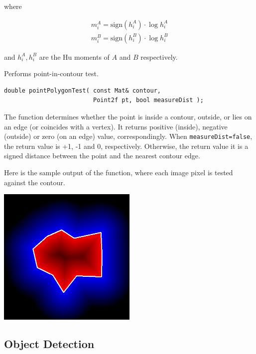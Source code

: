 \begin{description}
where

\[
\begin{array}{l}
m^A_i = \mathrm{sign}(h^A_i) \cdot \log{h^A_i} \\
m^B_i = \mathrm{sign}(h^B_i) \cdot \log{h^B_i}
\end{array}
\]

and $h^A_i, h^B_i$ are the Hu moments of $A$ and $B$ respectively.


\label{pointPolygonTest}
Performs point-in-contour test.

\begin{lstlisting}
double pointPolygonTest( const Mat& contour,
                         Point2f pt, bool measureDist );
\end{lstlisting}
\begin{description}
\end{description}

The function determines whether the
point is inside a contour, outside, or lies on an edge (or coincides
with a vertex). It returns positive (inside), negative (outside) or zero (on an edge) value,
correspondingly. When \texttt{measureDist=false}, the return value
is +1, -1 and 0, respectively. Otherwise, the return value
it is a signed distance between the point and the nearest contour
edge.

Here is the sample output of the function, where each image pixel is tested against the contour.

\includegraphics[width=0.5\textwidth]{pics/pointpolygon.png}

\subsection{Object Detection}


\end{description}
